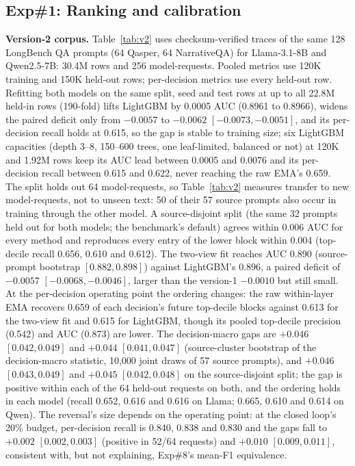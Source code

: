 \subsection{Exp\#1: Ranking and calibration}
\label{sec:exp-relevance}
\textbf{Version-2 corpus.} Table~\ref{tab:v2} uses checksum-verified traces of the same
128 LongBench QA prompts (64 Qasper, 64 NarrativeQA) for Llama-3.1-8B and Qwen2.5-7B:
30.4M rows and 256 model-requests. Pooled metrics use 120K training and 150K held-out
rows; per-decision metrics use every held-out row. Refitting both models on the same split, seed and test rows at up to all 22.8M held-in
rows (190-fold) lifts LightGBM by 0.0005 AUC (0.8961 to 0.8966), widens the paired
deficit only from $-0.0057$ to $-0.0062$ $[-0.0073,-0.0051]$, and its per-decision recall
holds at 0.615, so the gap is stable to training size; six LightGBM capacities (depth
3--8, 150--600 trees, one leaf-limited, balanced or not) at 120K and 1.92M rows keep its AUC lead between
0.0005 and 0.0076 and its per-decision recall between 0.615 and 0.622, never reaching
the raw EMA's 0.659. The split holds out 64 model-requests, so Table~\ref{tab:v2}
measures transfer to new model-requests, not to unseen text: 50 of their 57 source
prompts also occur in training through the other model. A source-disjoint split (the
same 32 prompts held out for both models; the benchmark's default) agrees within 0.006
AUC for every method and reproduces every entry of the lower block within 0.004
(top-decile recall 0.656, 0.610 and 0.612). The two-view fit reaches AUC 0.890 (source-prompt bootstrap
$[0.882,0.898]$) against LightGBM's 0.896, a paired deficit of $-0.0057$
$[-0.0068,-0.0046]$, larger than the version-1 $-0.0010$ but still small. At the
per-decision operating point the ordering changes: the raw within-layer EMA
recovers 0.659 of each decision's future top-decile blocks against 0.613 for the two-view
fit and 0.615 for LightGBM, though its pooled top-decile precision (0.542) and AUC
(0.873) are lower. The decision-macro gaps are $+0.046$ $[0.042,0.049]$ and $+0.044$
$[0.041,0.047]$ (source-cluster bootstrap of the decision-macro statistic, 10,000 joint
draws of 57 source prompts), and $+0.046$ $[0.043,0.049]$ and $+0.045$ $[0.042,0.048]$ on
the source-disjoint split; the gap is positive within each of the 64 held-out requests
on both, and the ordering holds in each model (recall 0.652, 0.616 and 0.616 on Llama;
0.665, 0.610 and 0.614 on Qwen). The reversal's size depends on the operating point: at
the closed loop's 20\% budget, per-decision recall is 0.840, 0.838 and 0.830 and the gaps
fall to $+0.002$ $[0.002,0.003]$ (positive in 52/64 requests) and $+0.010$
$[0.009,0.011]$, consistent with, but not explaining, Exp\#8's mean-F1 equivalence.


